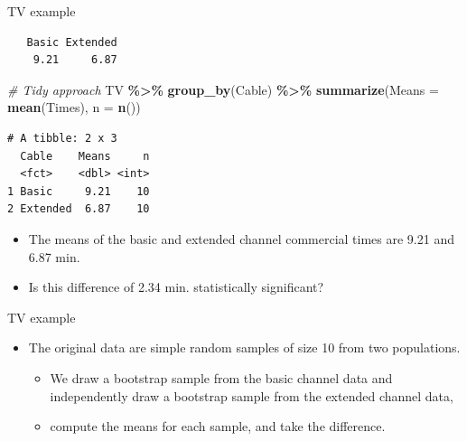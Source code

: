 \documentclass[
  ignorenonframetext,
]{beamer}
\newenvironment{Shaded}{\begin{snugshade}}{\end{snugshade}}
\newcommand{\AttributeTok}[1]{\textcolor[rgb]{0.13,0.29,0.53}{#1}}
\newcommand{\CommentTok}[1]{\textcolor[rgb]{0.56,0.35,0.01}{\textit{#1}}}
\newcommand{\FunctionTok}[1]{\textcolor[rgb]{0.13,0.29,0.53}{\textbf{#1}}}
\newcommand{\NormalTok}[1]{#1}
\newcommand{\OtherTok}[1]{\textcolor[rgb]{0.56,0.35,0.01}{#1}}
\newcommand{\SpecialCharTok}[1]{\textcolor[rgb]{0.81,0.36,0.00}{\textbf{#1}}}
\providecommand{\tightlist}{%
  \setlength{\itemsep}{0pt}\setlength{\parskip}{0pt}}
\begin{document}
\begin{frame}[fragile]{TV example}
\protect\hypertarget{tv-example-1}{}
\small

\begin{Shaded}
\end{Shaded}

\begin{verbatim}
   Basic Extended 
    9.21     6.87 
\end{verbatim}

\begin{Shaded}
\begin{Highlighting}[]
\CommentTok{\# Tidy approach}
\NormalTok{TV }\SpecialCharTok{\%\textgreater{}\%}
  \FunctionTok{group\_by}\NormalTok{(Cable) }\SpecialCharTok{\%\textgreater{}\%}
  \FunctionTok{summarize}\NormalTok{(}\AttributeTok{Means =} \FunctionTok{mean}\NormalTok{(Times), }\AttributeTok{n =} \FunctionTok{n}\NormalTok{())}
\end{Highlighting}
\end{Shaded}

\begin{verbatim}
# A tibble: 2 x 3
  Cable    Means     n
  <fct>    <dbl> <int>
1 Basic     9.21    10
2 Extended  6.87    10
\end{verbatim}

\normalsize

\begin{itemize}
\item
  The means of the basic and extended channel commercial times are 9.21
  and 6.87 min.
\item
  Is this difference of 2.34 min. statistically significant?
\end{itemize}
\end{frame}

\begin{frame}{TV example}
\protect\hypertarget{tv-example-2}{}
\begin{itemize}
\item
  The original data are simple random samples of size 10 from two
  populations.

  \begin{itemize}
  \tightlist
  \item
    We draw a bootstrap sample from the basic channel data and
    independently draw a bootstrap sample from the extended channel
    data,
  \item
    compute the means for each sample, and take the difference.
  \end{itemize}
\end{itemize}
\end{frame}
\end{document}
